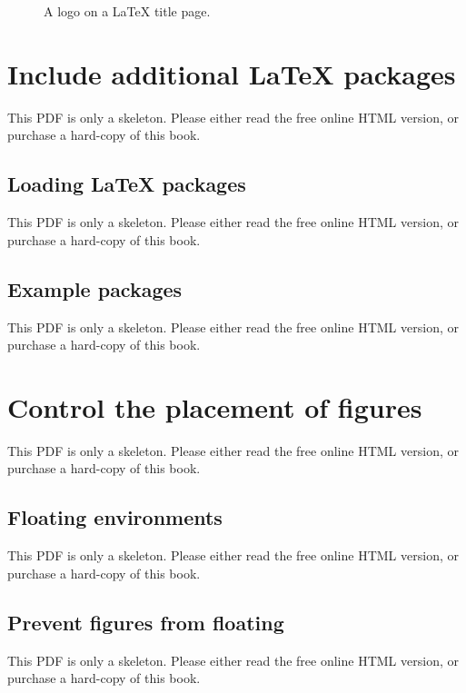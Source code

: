 \documentclass[
  11pt,
]{krantz}
\begin{document}
\begin{figure}\caption{A logo on a LaTeX title page.}\end{figure}

\section{Include additional LaTeX packages}\label{latex-extra}

This PDF is only a skeleton. Please either read the free online HTML version, or purchase a hard-copy of this book.

\subsection{Loading LaTeX packages}\label{loading-latex-packages}

This PDF is only a skeleton. Please either read the free online HTML version, or purchase a hard-copy of this book.

\subsection{Example packages}\label{example-packages}

This PDF is only a skeleton. Please either read the free online HTML version, or purchase a hard-copy of this book.

\section{Control the placement of figures}\label{figure-placement}

This PDF is only a skeleton. Please either read the free online HTML version, or purchase a hard-copy of this book.

\subsection{Floating environments}\label{floating-environments}

This PDF is only a skeleton. Please either read the free online HTML version, or purchase a hard-copy of this book.

\subsection{Prevent figures from floating}\label{prevent-figures-from-floating}

This PDF is only a skeleton. Please either read the free online HTML version, or purchase a hard-copy of this book.
\end{document}
